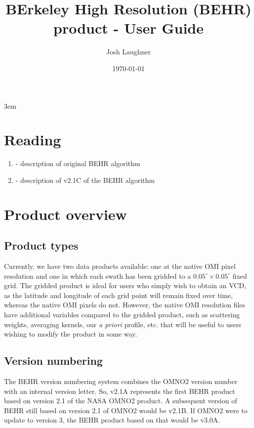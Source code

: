 \documentclass[12pt]{article}
\title{BErkeley High Resolution (BEHR) \ce{NO2} product - User Guide}
\author{Josh Laughner}
\date{\today}
\begin{document}
\maketitle

\emergencystretch 3em

\tableofcontents

\section{Reading}

	\begin{enumerate}
		\item \citet{russell11} - description of original BEHR algorithm
		\item \citet{laughner17} - description of v2.1C of the BEHR algorithm
	\end{enumerate}


\section{Product overview}

	\subsection{Product types}
	Currently, we have two data products available: one at the native OMI pixel resolution and one in which each swath has been gridded to a $0.05^\circ \times 0.05^\circ$ fixed grid. The gridded product is ideal for users who simply wish to obtain an  VCD, as the latitude and longitude of each grid point will remain fixed over time, whereas the native OMI pixels do not. However, the native OMI resolution files have additional variables compared to the gridded product, such as scattering weights, averaging kernels, our  \emph{a priori} profile, etc. that will be useful to users wishing to modify the product in some way.
	
	
	\subsection{Version numbering}
	The BEHR version numbering system combines the OMNO2 version number with an
internal version letter. So, v2.1A represents the first BEHR product based on
version 2.1 of the NASA OMNO2 product. A subsequent version of BEHR still based
on version 2.1 of OMNO2 would be v2.1B. If OMNO2 were to update to version 3,
the BEHR product based on that would be v3.0A.
\end{document}
